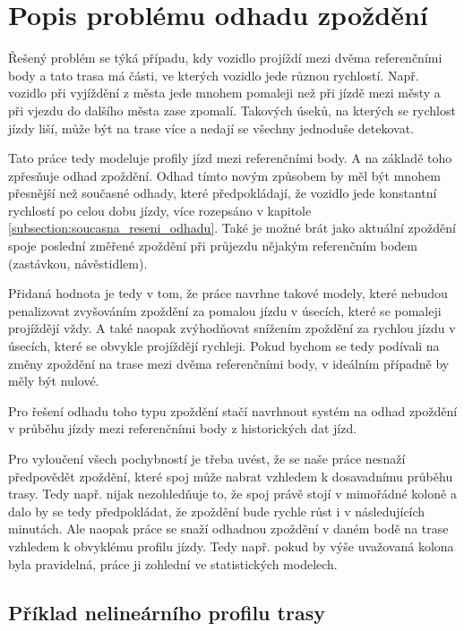 \section{Popis problému odhadu zpoždění}

Řešený problém se týká případu, kdy vozidlo projíždí mezi dvěma referenčními body a tato trasa má části, ve kterých vozidlo jede různou rychlostí. Např. vozidlo při vyjíždění z města jede mnohem pomaleji než při jízdě mezi městy a při vjezdu do dalšího města zase zpomalí. Takových úseků, na kterých se rychlost jízdy liší, může být na trase více a nedají se všechny jednoduše detekovat.

\bigbreak

Tato práce tedy modeluje profily jízd mezi referenčními body. A na základě toho zpřesňuje odhad zpoždění. Odhad tímto novým způsobem by měl být mnohem přesnější než současné odhady, které předpokládají, že vozidlo jede konstantní rychlostí po celou dobu jízdy, více rozepsáno v kapitole \ref{subsection:soucasna_reseni_odhadu}. Také je možné brát jako aktuální zpoždění spoje poslední změřené zpoždění při průjezdu nějakým referenčním bodem (zastávkou, návěstidlem).

\bigbreak

Přidaná hodnota je tedy v tom, že práce navrhne takové modely, které nebudou penalizovat zvyšováním zpoždění za pomalou jízdu v úsecích, které se pomaleji projíždějí vždy. A také naopak zvýhodňovat snížením zpoždění za rychlou jízdu v úsecích, které se obvykle projíždějí rychleji. Pokud bychom se tedy podívali na změny zpoždění na trase mezi dvěma referenčními body, v ideálním případně by měly být nulové.

\bigbreak

Pro řešení odhadu toho typu zpoždění stačí navrhnout systém na odhad zpoždění v průběhu jízdy mezi referenčními body z historických dat jízd.

\bigbreak

Pro vyloučení všech pochybností je třeba uvést, že se naše práce nesnaží předpovědět zpoždění, které spoj může nabrat vzhledem k dosavadnímu průběhu trasy. Tedy např. nijak nezohledňuje to, že spoj právě stojí v mimořádné koloně a dalo by se tedy předpokládat, že zpoždění bude rychle růst i v následujících minutách. Ale naopak práce se snaží odhadnou zpoždění v daném bodě na trase vzhledem k obvyklému profilu jízdy. Tedy např. pokud by výše uvažovaná kolona byla pravidelná, práce ji zohlední ve statistických modelech.


\subsection{Příklad nelineárního profilu trasy} \label{subsection:priklad_nelinearni_trasa}


